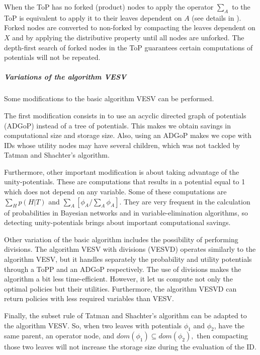 When the ToP has no forked (product) nodes to apply the operator
$\sum_{A}$ to the ToP is equivalent to apply it to their leaves
dependent on $A$ (see details in \cite{luque04}). Forked nodes are
converted to non-forked by compacting the leaves dependent on $X$
and by applying the distributive property until all nodes are
unforked. The depth-first search of forked nodes in the ToP
guarantees certain computations of potentials will not be repeated.

\subparagraph{Variations of the algorithm VESV}

Some modifications to the basic algorithm VESV can be performed.

The first modification consists in to use an acyclic directed graph of
potentials (ADGoP) instead of a tree of potentials. This makes we obtain
savings in computational size and storage size. Also, using an ADGoP makes
we cope with IDs whose utility nodes may have several children, which was
not tackled by Tatman and Shachter's algorithm.

Furthermore, other important modification is about taking advantage of the
unity-potentials. These are computations that results in a potential equal
to 1 which does not depend on any variable. Some of these computations are $%
\sum_{H}p(H|T)$ and $\sum_{A}[\phi _{A}/\sum_{A}\phi _{A}].$ They are very
frequent in the calculation of probabilities in Bayesian networks and in
variable-elimination algorithms, so detecting unity-potentials brings about
important computational savings.

Other variation of the basic algorithm includes the possibility of
performing divisions. The algorithm VESV with divisions (VESVD) operates
similarly to the algorithm VESV, but it handles separately the probability
and utility potentials through a ToPP and an ADGoP respectively. The use of
divisions makes the algorithm a bit less time-efficient. However, it let us
compute not only the optimal policies but their utilities. Furthermore, the
algorithm VESVD can return policies with less required variables than VESV.

Finally, the subset rule of Tatman and Shachter's algorithm can be adapted
to the algorithm VESV. So, when two leaves with potentials $\phi _{1}$ and $%
\phi _{2}$, have the same parent, an operator node, and $dom(\phi
_{1})\subseteq dom(\phi _{2}),$ then compacting those two leaves will not
increase the storage size during the evaluation of the ID.


